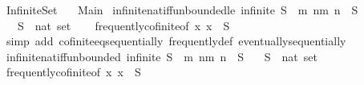 %
\begin{isabellebody}%
%
%
\isadelimdocument
%
\endisadelimdocument
%
\isatagdocument
%
\isamarkuptrue%
%
\endisatagdocument
{\isafolddocument}%
%
\isadelimdocument
%
\endisadelimdocument
%
\isadelimtheory
%
\endisadelimtheory
%
\isatagtheory
{}\isamarkupfalse%
\ Infinite{\isacharunderscore}Set\isanewline
\ \ \ Main\isanewline
{}%
\endisatagtheory
{\isafoldtheory}%
%
\isadelimtheory
%
\endisadelimtheory
%
\isadelimdocument
%
\endisadelimdocument
%
\isatagdocument
%
\isamarkuptrue%
%
\endisatagdocument
{\isafolddocument}%
%
\isadelimdocument
%
\endisadelimdocument
{}\isamarkupfalse%
\ infinite{\isacharunderscore}nat{\isacharunderscore}iff{\isacharunderscore}unbounded{\isacharunderscore}le{\isacharcolon}\ {\isachardoublequoteopen}infinite\ S\ {\isasymlongleftrightarrow}\ {\isacharparenleft}{\isasymforall}m{\isachardot}\ {\isasymexists}n{\isasymge}m{\isachardot}\ n\ {\isasymin}\ S{\isacharparenright}{\isachardoublequoteclose}\isanewline
\ \ \ S\ {\isacharcolon}{\isacharcolon}\ {\isachardoublequoteopen}nat\ set{\isachardoublequoteclose}\isanewline
%
\isadelimproof
\ \ %
\endisadelimproof
%
\isatagproof
{}\isamarkupfalse%
\ frequently{\isacharunderscore}cofinite{\isacharbrackleft}of\ {\isachardoublequoteopen}{\isasymlambda}x{\isachardot}\ x\ {\isasymin}\ S{\isachardoublequoteclose}{\isacharbrackright}\isanewline
\ \ \isamarkupfalse%
\ {\isacharparenleft}simp\ add{\isacharcolon}\ cofinite{\isacharunderscore}eq{\isacharunderscore}sequentially\ frequently{\isacharunderscore}def\ eventually{\isacharunderscore}sequentially{\isacharparenright}%
\endisatagproof
{\isafoldproof}%
%
\isadelimproof
\isanewline
%
\endisadelimproof
\isanewline
{}\isamarkupfalse%
\ infinite{\isacharunderscore}nat{\isacharunderscore}iff{\isacharunderscore}unbounded{\isacharcolon}\ {\isachardoublequoteopen}infinite\ S\ {\isasymlongleftrightarrow}\ {\isacharparenleft}{\isasymforall}m{\isachardot}\ {\isasymexists}n{\isachargreater}m{\isachardot}\ n\ {\isasymin}\ S{\isacharparenright}{\isachardoublequoteclose}\isanewline
\ \ \ S\ {\isacharcolon}{\isacharcolon}\ {\isachardoublequoteopen}nat\ set{\isachardoublequoteclose}\isanewline
%
\isadelimproof
\ \ %
\endisadelimproof
%
\isatagproof
{}\isamarkupfalse%
\ frequently{\isacharunderscore}cofinite{\isacharbrackleft}of\ {\isachardoublequoteopen}{\isasymlambda}x{\isachardot}\ x\ {\isasymin}\ S{\isachardoublequoteclose}{\isacharbrackright}\isanewline

\end{isabellebody}
